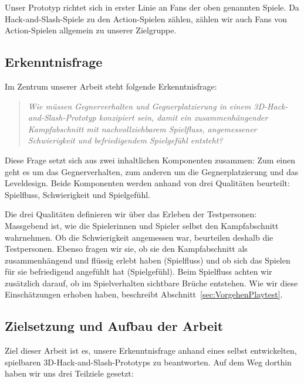 \documentclass[../Main.tex]{subfiles}
\begin{document}
Unser Prototyp richtet sich in erster Linie an Fans der oben genannten Spiele. Da Hack-and-Slash-Spiele zu den Action-Spielen zählen,\autocite{wikipedia_hackandslash} zählen wir auch Fans von Action-Spielen allgemein zu unserer Zielgruppe.

\subsection{Erkenntnisfrage} \label{sec:Erkenntnisfrage}

Im Zentrum unserer Arbeit steht folgende Erkenntnisfrage:

\vspace{\baselineskip}

\begin{quote}
    \textit{Wie müssen Gegnerverhalten und Gegnerplatzierung in einem 3D-Hack-and-Slash-Prototyp konzipiert sein, damit ein zusammenhängender Kampfabschnitt mit nachvollziehbarem Spielfluss, angemessener Schwierigkeit und befriedigendem Spielgefühl entsteht?}
\end{quote}

\vspace{\baselineskip}

Diese Frage setzt sich aus zwei inhaltlichen Komponenten zusammen: Zum einen geht es um das Gegnerverhalten, zum anderen um die Gegnerplatzierung und das Leveldesign. Beide Komponenten werden anhand von drei Qualitäten beurteilt: Spielfluss, Schwierigkeit und Spielgefühl.

Die drei Qualitäten definieren wir über das Erleben der Testpersonen: Massgebend ist, wie die Spielerinnen und Spieler selbst den Kampfabschnitt wahrnehmen. Ob die Schwierigkeit angemessen war, beurteilen deshalb die Testpersonen. Ebenso fragen wir sie, ob sie den Kampfabschnitt als zusammenhängend und flüssig erlebt haben (Spielfluss) und ob sich das Spielen für sie befriedigend angefühlt hat (Spielgefühl). Beim Spielfluss achten wir zusätzlich darauf, ob im Spielverhalten sichtbare Brüche entstehen. Wie wir diese Einschätzungen erhoben haben, beschreibt Abschnitt~\ref{sec:VorgehenPlaytest}.

\subsection{Zielsetzung und Aufbau der Arbeit} \label{sec:Aufbau}

Ziel dieser Arbeit ist es, unsere Erkenntnisfrage anhand eines selbst entwickelten, spielbaren 3D-Hack-and-Slash-Prototyps zu beantworten. Auf dem Weg dorthin haben wir uns drei Teilziele gesetzt:
\end{document}
